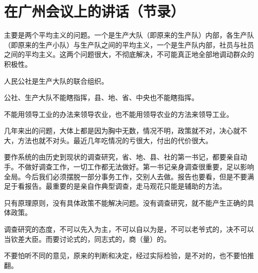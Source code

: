 \section[在广州会议上的讲话（节录）（一九六一年三月）]{在广州会议上的讲话（节录）}

主要是两个平均主义的问题。一个是生产大队（即原来的生产队）内部，各生产队（即原来的生产小队）与生产队之间的平均主义，一个是生产队内部，社员与社员之间的平均主义。这两个问题很大，不彻底解决，不可能真正地全部地调动群众的积极性。

人民公社是生产大队的联合组织。

公社、生产大队不能瞎指挥，县、地、省、中央也不能瞎指挥。

不能用领导工业的办法来领导农业，也不能用领导农业的方法来领导工业。


几年来出的问题，大体上都是因为胸中无数，情况不明，政策就不对，决心就不大，方法也就不对头。最近几年吃情况的亏很大，付出的代价很大。

要作系统的由历史到现状的调查研究，省、地、县、社的第一书记，都要亲自动手。不做好调查工作，一切工作都无法做好。第一书记亲身调查很重要，足以影响全局。今后我们必须摆脱一部分事务工作，交别人去做。报告也要看，但是不要满足于看报告。最重要的是亲自作典型调查，走马观花只能是辅助的方法。

只有原理原则，没有具体政策不能解决问题。没有调查研究，就不能产生正确的具体政策。

调查研究的态度，不可以先入为主，不可以自以为是，不可以老爷式的，决不可以当钦差大臣。而要讨论式的，同志式的，商（量）的。

不要怕听不同的意见，原来的判断和决定，经过实际检验，是不对的，也不要怕推翻。

